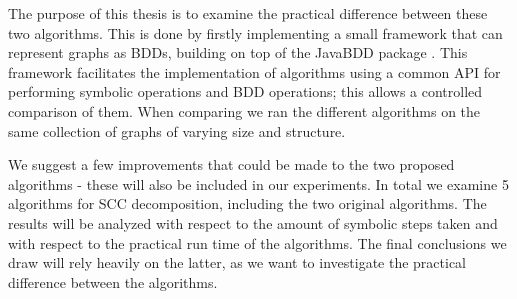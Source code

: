 \documentclass[../master/master.tex]{subfiles}
\begin{document}
The purpose of this thesis is to examine the practical difference between these two algorithms. This is done by firstly implementing a small framework that can represent graphs as BDDs, building on top of the JavaBDD package \cite{whaley}. This framework facilitates the implementation of algorithms using a common API for performing symbolic operations and BDD operations; this allows a controlled comparison of them. 
When comparing we ran the different algorithms on the same collection of graphs of varying size and structure.

We suggest a few improvements that could be made to the two proposed algorithms - these will also be included in our experiments. In total we examine 5 algorithms for SCC decomposition, including the two original algorithms. The results will be analyzed with respect to the amount of symbolic steps taken and with respect to the practical run time of the algorithms. The final conclusions we draw will rely heavily on the latter, as we want to investigate the practical difference between the algorithms.
\end{document}
